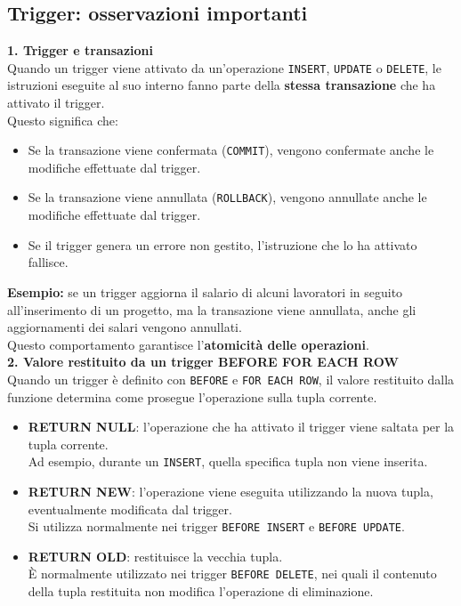 \subsection{Trigger: osservazioni importanti}
\textbf{1. Trigger e transazioni}\\
Quando un trigger viene attivato da un'operazione
\texttt{INSERT}, \texttt{UPDATE} o \texttt{DELETE},
le istruzioni eseguite al suo interno fanno parte
della \textbf{stessa transazione} che ha attivato il trigger.\\
Questo significa che:
\begin{itemize}
    \item Se la transazione viene confermata
    (\texttt{COMMIT}), vengono confermate anche
    le modifiche effettuate dal trigger.
    \item Se la transazione viene annullata
    (\texttt{ROLLBACK}), vengono annullate anche
    le modifiche effettuate dal trigger.
    \item Se il trigger genera un errore non gestito,
    l'istruzione che lo ha attivato fallisce.
\end{itemize}
\noindent
\textbf{Esempio:} se un trigger aggiorna il salario
di alcuni lavoratori in seguito all'inserimento
di un progetto, ma la transazione viene annullata,
anche gli aggiornamenti dei salari vengono annullati.\\
Questo comportamento garantisce
l'\textbf{atomicità delle operazioni}.\medskip\\
\textbf{2. Valore restituito da un trigger BEFORE FOR EACH ROW}\\
Quando un trigger è definito con
\texttt{BEFORE} e \texttt{FOR EACH ROW},
il valore restituito dalla funzione determina
come prosegue l'operazione sulla tupla corrente.
\begin{itemize}
    \item \textbf{RETURN NULL}: l'operazione
    che ha attivato il trigger viene saltata
    per la tupla corrente.\\
    Ad esempio, durante un \texttt{INSERT},
    quella specifica tupla non viene inserita.

    \item \textbf{RETURN NEW}: l'operazione
    viene eseguita utilizzando la nuova tupla,
    eventualmente modificata dal trigger.\\
    Si utilizza normalmente nei trigger
    \texttt{BEFORE INSERT} e \texttt{BEFORE UPDATE}.

    \item \textbf{RETURN OLD}: restituisce
    la vecchia tupla.\\
    È normalmente utilizzato nei trigger
    \texttt{BEFORE DELETE}, nei quali il contenuto
    della tupla restituita non modifica
    l'operazione di eliminazione.
\end{itemize}
